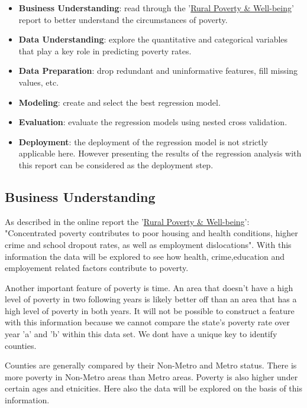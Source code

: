 \documentclass[11pt]{article}
\providecommand{\tightlist}{%
      \setlength{\itemsep}{0pt}\setlength{\parskip}{0pt}}
\begin{document}
\begin{itemize}
\tightlist
\item
  \textbf{Business Understanding}: read through the
  '\href{https://www.ers.usda.gov/topics/rural-economy-population/rural-poverty-well-being/poverty-overview.aspx}{Rural
  Poverty \& Well-being}' report to better understand the circumstances
  of poverty.
\item
  \textbf{Data Understanding}: explore the quantitative and categorical
  variables that play a key role in predicting poverty rates.
\item
  \textbf{Data Preparation}: drop redundant and uninformative features,
  fill missing values, etc.
\item
  \textbf{Modeling}: create and select the best regression model.
\item
  \textbf{Evaluation}: evaluate the regression models using nested cross
  validation.
\item
  \textbf{Deployment}: the deployment of the regression model is not
  strictly applicable here. However presenting the results of the
  regression analysis with this report can be considered as the
  deployment step.
\end{itemize}

\subsection{Business Understanding}\label{business-understanding}

As described in the online report the
'\href{https://www.ers.usda.gov/topics/rural-economy-population/rural-poverty-well-being/poverty-overview.aspx}{Rural
Poverty \& Well-being}': "Concentrated poverty contributes to poor
housing and health conditions, higher crime and school dropout rates, as
well as employment dislocations". With this information the data will be
explored to see how health, crime,education and employement related
factors contribute to poverty.

Another important feature of poverty is time. An area that doesn't have
a high level of poverty in two following years is likely better off than
an area that has a high level of poverty in both years. It will not be
possible to construct a feature with this information because we cannot
compare the state's poverty rate over year 'a' and 'b' within this data
set. We dont have a unique key to identify counties.

Counties are generally compared by their Non-Metro and Metro status.
There is more poverty in Non-Metro areas than Metro areas. Poverty is
also higher under certain ages and etnicities. Here also the data will
be explored on the basis of this information.
\end{document}
